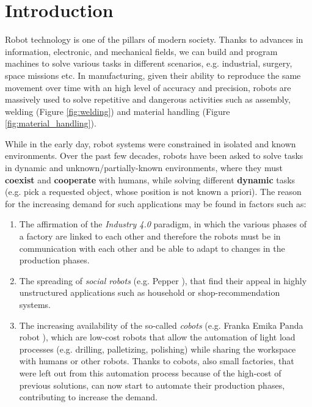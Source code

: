 \section{Introduction}
\label{sec:intro}
Robot technology is one of the pillars of modern society. Thanks to advances in information, electronic, and
mechanical fields, we can build and program machines to solve various tasks in different scenarios, e.g. industrial,
surgery, space missions etc. \newline In manufacturing, given their ability to reproduce the same movement over time
with an high level of accuracy and precision, robots are massively used to solve repetitive and dangerous activities
such as assembly, welding (Figure \ref{fig:welding}) and material handling    (Figure \ref{fig:material_handling}).

\noindent While in the early day, robot systems were constrained in isolated and known environments. Over the past few
decades, robots have been asked to solve tasks in dynamic and unknown/partially-known environments, where they must
\textbf{coexist} and \textbf{cooperate} with humans, while  solving different \textbf{dynamic} tasks (e.g. pick a
requested object, whose position is not known a priori). \newline The reason for the increasing demand for such
applications may be found in factors such as:
\begin{enumerate}[label=(\alph*)]
    \item The affirmation of the \textit{Industry 4.0} paradigm, in which the various phases of a factory are linked to
    each other and therefore the robots must be in communication with each other and be able to adapt to changes in the
    production phases.
    \item The spreading of \textit{social robots} (e.g. Pepper \cite{pepper}), that find their appeal in highly
    unstructured applications such as household or shop-recommendation systems.      
    \item The increasing availability of the so-called \textit{cobots} (e.g. Franka Emika Panda robot \cite{panda}),
    which are low-cost robots that allow the automation of light load processes (e.g. drilling, palletizing, polishing)
    while sharing the workspace with humans or other robots. Thanks to cobots, also small factories, that were left out
    from this automation process because of the high-cost of previous solutions, can now start to automate their
    production phases, contributing to increase the demand.
\end{enumerate}
